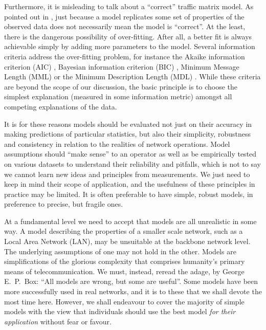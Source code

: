 
Furthermore, it is misleading to talk about a ``correct'' traffic
matrix model. As pointed out in \cite{Alderson06Topology}, just
because a model replicates some set of properties of the observed data
does not necessarily mean the model is ``correct''. At the least,
there is the dangerous possibility of over-fitting. After all, a
better fit is always achievable simply by adding more parameters to
the model.  Several information criteria address the over-fitting
problem, for instance the Akaike information criterion (AIC)
\cite{Akaike74AIC}, Bayesian information criterion (BIC)
\cite{Schwarz78BIC}, Minimum Message Length (MML) \cite{Wallace99MML}
or the Minimum Description Length (MDL) \cite{Rissanen83MDL}. While
these criteria are beyond the scope of our discussion, the basic
principle is to choose the simplest explanation (measured in some
information metric) amongst all competing explanations of the data.


It is for these reasons models should be evaluated not just on their
accuracy in making predictions of particular statistics, but also
their simplicity, robustness and consistency in relation to the
realities of network operations. Model assumptions should ``make
sense'' to an operator as well as be empirically tested on various
datasets to understand their reliability and pitfalls, which is not to
say we cannot learn new ideas and principles from measurements. We just
need to keep in mind their scope of application, and the usefulness of
these principles in practice may be limited.  It is often preferable to have simple, robust models, in
preference to precise, but fragile ones.

At a fundamental level we need to accept that models are all
unrealistic in some way. A model describing the properties of a
smaller scale network, such as a Local Area Network (LAN), may be
unsuitable at the backbone network level. The underlying assumptions
of one may not hold in the other. Models are simplifications of the
glorious complexity that comprises humanity's primary means of
telecommunication. We must, instead, reread the adage, by George
E.~P.~Box: ``All models are wrong, but some are useful''.  Some models
have been more successfully used in real networks, and it is to these
that we shall devote the most time here. However, we shall endeavour to
cover the majority of simple models with the view that individuals
should use the best model {\em for their application} without fear or
favour.

